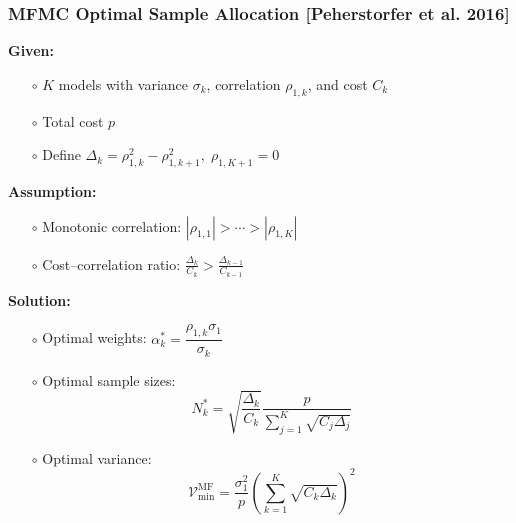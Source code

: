 \documentclass{beamer}
\begin{document}
\begin{frame}[t]
    \frametitle{MFMC Optimal Sample Allocation {\small [Peherstorfer et al. 2016]}}
        {\fontsize{8}{8}\selectfont 
        \textcolor{myblue3}{\bf \normalsize Given:}
        \begin{itemize}[leftmargin=15pt] 
            \item[$\circ$] $K$ models with variance $\sigma_k$, correlation $\rho_{1,k}$, and cost $C_k$
            \item[$\circ$] Total cost $p$
            \item[$\circ$] Define $\Delta_k = \rho_{1,k}^2 - \rho_{1,k+1}^2, \;\rho_{1,K+1}=0$
        \end{itemize}

        \textcolor{myblue3}{\bf \normalsize Assumption:}
        \begin{itemize}[leftmargin=15pt] 
            \item[$\circ$] Monotonic correlation: $|\rho_{1,1}| > \cdots > |\rho_{1,K}|$
            \item[$\circ$] Cost–correlation ratio: $\frac{\Delta_{k}}{C_k} > \frac{\Delta_{k-1}}{C_{k-1}}$
        \end{itemize}

        \vspace{5mm}

        
        \textcolor{myblue3}{\bf \normalsize Solution:}
        \begin{itemize}[leftmargin=15pt] 
            \item[$\circ$] Optimal weights: $\alpha_k^* = \dfrac{\rho_{1,k}\sigma_1}{\sigma_k}$
            \item[$\circ$] Optimal sample sizes:
            \[
        N_k^* = \sqrt{\frac{\Delta_k}{C_k}}\frac{p}{\sum_{j=1}^K \sqrt{C_j\Delta_j}}
        \] 
            \item[$\circ$] Optimal variance:
        \begin{equation*}
        \label{eq:MFMC_variance_optimal}
        \mathcal{V}^{\text{MF}}_{\min} =
        \frac{\sigma_1^2}{p}\left(\sum_{k=1}^K\sqrt{C_k\Delta_{k}}\right)^2
        \end{equation*}
        \end{itemize}
        
        }

\end{frame}
\end{document}
